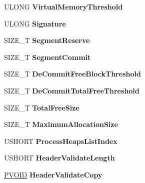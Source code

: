 \begin{DoxyCompactItemize}
\item 
\mbox{\label{struct___h_e_a_p_a2f5d38e100a5e706c95ebb7214a70147}} 
U\+L\+O\+NG {\bfseries Virtual\+Memory\+Threshold}
\item 
\mbox{\label{struct___h_e_a_p_abb5306e7df687cd7e238d980289bb924}} 
U\+L\+O\+NG {\bfseries Signature}
\item 
\mbox{\label{struct___h_e_a_p_a8d0d8e2eb915248dfc7dc3fabc09baa4}} 
S\+I\+Z\+E\+\_\+T {\bfseries Segment\+Reserve}
\item 
\mbox{\label{struct___h_e_a_p_a83b4e9ebdc9580cabbe7a928a68fa566}} 
S\+I\+Z\+E\+\_\+T {\bfseries Segment\+Commit}
\item 
\mbox{\label{struct___h_e_a_p_ace4c395150440f75e55630512e07bae6}} 
S\+I\+Z\+E\+\_\+T {\bfseries De\+Commit\+Free\+Block\+Threshold}
\item 
\mbox{\label{struct___h_e_a_p_af12a68f95aa28ebf55aecd482e72fd49}} 
S\+I\+Z\+E\+\_\+T {\bfseries De\+Commit\+Total\+Free\+Threshold}
\item 
\mbox{\label{struct___h_e_a_p_a72fe9231b20c2c487e5c89335023eb17}} 
S\+I\+Z\+E\+\_\+T {\bfseries Total\+Free\+Size}
\item 
\mbox{\label{struct___h_e_a_p_ac3cb5bb15a15add8857f5f8d93686ddc}} 
S\+I\+Z\+E\+\_\+T {\bfseries Maximum\+Allocation\+Size}
\item 
\mbox{\label{struct___h_e_a_p_aa8fb1f8af8201447c6cba88fc28a5c9f}} 
U\+S\+H\+O\+RT {\bfseries Process\+Heaps\+List\+Index}
\item 
\mbox{\label{struct___h_e_a_p_a0f90b50780e050294c4a6c17eb2010fe}} 
U\+S\+H\+O\+RT {\bfseries Header\+Validate\+Length}
\item 
\mbox{\label{struct___h_e_a_p_ae8e6714d3848a5968673794512606b88}} 
\hyperlink{interfacevoid}{P\+V\+O\+ID} {\bfseries Header\+Validate\+Copy}
\item 
\mbox{\label{struct___h_e_a_p_a719130324476a2100fc3c30e15daf818}} 

\end{DoxyCompactItemize}
